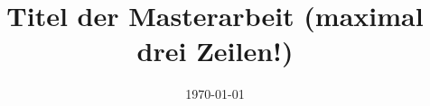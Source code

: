 \documentclass[
  type=MA, %
  lang=german, %
  study=Umwelt, %
  uni=LFUI, %
  expose=true, %
  explanation=true, %
  specialization=BBP, %
]{ftwthesis}
\title{Titel der Masterarbeit (maximal drei Zeilen!)}
\date{\today}
\begin{document}
\tableofcontents*\cleardoublepage

\listoffigures\cleardoublepage

\listoftables\cleardoublepage



\FTWBlindDocument



\end{document}
